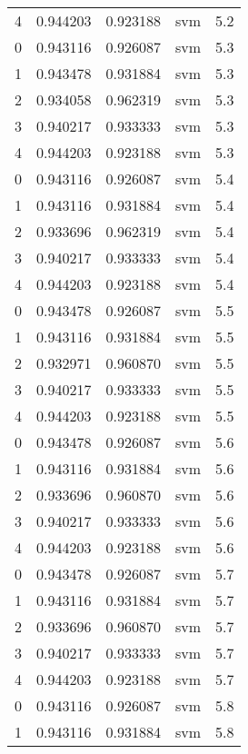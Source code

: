 \begin{tabular}{rrrlr}
     4 & 0.944203 & 0.923188 &      svm &        5.2 \\
     0 & 0.943116 & 0.926087 &      svm &        5.3 \\
     1 & 0.943478 & 0.931884 &      svm &        5.3 \\
     2 & 0.934058 & 0.962319 &      svm &        5.3 \\
     3 & 0.940217 & 0.933333 &      svm &        5.3 \\
     4 & 0.944203 & 0.923188 &      svm &        5.3 \\
     0 & 0.943116 & 0.926087 &      svm &        5.4 \\
     1 & 0.943116 & 0.931884 &      svm &        5.4 \\
     2 & 0.933696 & 0.962319 &      svm &        5.4 \\
     3 & 0.940217 & 0.933333 &      svm &        5.4 \\
     4 & 0.944203 & 0.923188 &      svm &        5.4 \\
     0 & 0.943478 & 0.926087 &      svm &        5.5 \\
     1 & 0.943116 & 0.931884 &      svm &        5.5 \\
     2 & 0.932971 & 0.960870 &      svm &        5.5 \\
     3 & 0.940217 & 0.933333 &      svm &        5.5 \\
     4 & 0.944203 & 0.923188 &      svm &        5.5 \\
     0 & 0.943478 & 0.926087 &      svm &        5.6 \\
     1 & 0.943116 & 0.931884 &      svm &        5.6 \\
     2 & 0.933696 & 0.960870 &      svm &        5.6 \\
     3 & 0.940217 & 0.933333 &      svm &        5.6 \\
     4 & 0.944203 & 0.923188 &      svm &        5.6 \\
     0 & 0.943478 & 0.926087 &      svm &        5.7 \\
     1 & 0.943116 & 0.931884 &      svm &        5.7 \\
     2 & 0.933696 & 0.960870 &      svm &        5.7 \\
     3 & 0.940217 & 0.933333 &      svm &        5.7 \\
     4 & 0.944203 & 0.923188 &      svm &        5.7 \\
     0 & 0.943116 & 0.926087 &      svm &        5.8 \\
     1 & 0.943116 & 0.931884 &      svm &        5.8 \\

\end{tabular}

